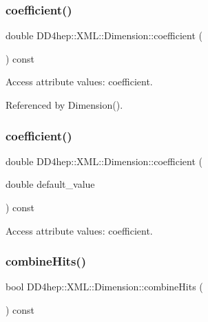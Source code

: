\subsubsection{\texorpdfstring{coefficient()}{coefficient()}\hspace{0.1cm}{\footnotesize\ttfamily [1/2]}}
{\footnotesize\ttfamily double D\+D4hep\+::\+X\+M\+L\+::\+Dimension\+::coefficient (\begin{DoxyParamCaption}{ }\end{DoxyParamCaption}) const}



Access attribute values\+: coefficient. 



Referenced by Dimension().

\hypertarget{struct_d_d4hep_1_1_x_m_l_1_1_dimension_ac79acf81f407b22e67430a742919eb0f}{}\label{struct_d_d4hep_1_1_x_m_l_1_1_dimension_ac79acf81f407b22e67430a742919eb0f} 
\subsubsection{\texorpdfstring{coefficient()}{coefficient()}\hspace{0.1cm}{\footnotesize\ttfamily [2/2]}}
{\footnotesize\ttfamily double D\+D4hep\+::\+X\+M\+L\+::\+Dimension\+::coefficient (\begin{DoxyParamCaption}\item[{double}]{default\+\_\+value }\end{DoxyParamCaption}) const}



Access attribute values\+: coefficient. 

\hypertarget{struct_d_d4hep_1_1_x_m_l_1_1_dimension_aaef5b1bfa1b163529863ab90457c4d29}{}\label{struct_d_d4hep_1_1_x_m_l_1_1_dimension_aaef5b1bfa1b163529863ab90457c4d29} 
\subsubsection{\texorpdfstring{combine\+Hits()}{combineHits()}}
{\footnotesize\ttfamily bool D\+D4hep\+::\+X\+M\+L\+::\+Dimension\+::combine\+Hits (\begin{DoxyParamCaption}{ }\end{DoxyParamCaption}) const}



